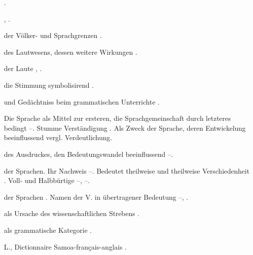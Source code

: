 \begin{register}
 \pageref{sp.103}.

 \pageref{sp.171}, \pageref{sp.186}.


 der Völker- und Sprachgrenzen \pageref{sp.293}.

 des Lautwesens, dessen weitere Wirkungen \pageref{sp.178}.

 der Laute \pageref{sp.200}, \pageref{sp.351}.


 die Stimmung symbolisirend \pageref{sp.227}.

 und Gedächtniss beim grammatischen Unterrichte \pageref{sp.110}.

 Die Sprache als Mittel zur ersteren, die Sprachgemeinschaft durch letzteres bedingt \pageref{sp.54}–\pageref{sp.58}. Stumme Verständigung \pageref{sp.67}. Als Zweck der Sprache, deren Entwickelung beeinflussend \pageref{sp.182}\sed{, \pageref{sp.360},} vergl. Verdeutlichung.

 des Ausdruckes, den Bedeutungswandel beeinflussend \pageref{sp.239}–\pageref{sp.243}.



 der Sprachen. Ihr Nachweis \pageref{sp.142}–\pageref{sp.168}. Bedeutet theilweise  und theilweise Verschiedenheit \pageref{sp.148}. Voll- und Halbbürtige \pageref{sp.158}–\pageref{sp.159}, \pageref{sp.278}–\pageref{sp.283}.


 der Sprachen \pageref{sp.9}. Namen der V. in übertragener Bedeutung \pageref{sp.41}–\pageref{sp.42}, \pageref{sp.145}.

 als Ursache des wissenschaftlichen Strebens \pageref{sp.17}.

 als grammatische Kategorie \pageref{sp.101}.


 L., Dictionnaire Samoa-français-anglais \pageref{sp.463}.


\end{register}
